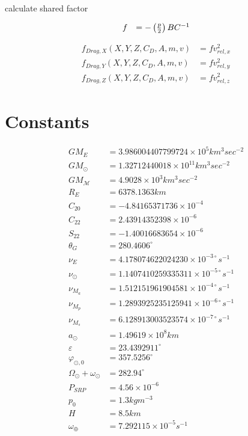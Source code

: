 \documentclass{article}
\begin{document}
calculate shared factor

\begin{equation}
\begin{array}{ll}
f &= -\left(p \over 2\right)BC^{-1}
\end{array}
\end{equation}

\begin{equation}
\begin{array}{ll}
f_{Drag,X}(X,Y,Z,C_D,A,m,v) &= fv_{rel,x}^2 \\
f_{Drag,Y}(X,Y,Z,C_D,A,m,v) &= fv_{rel,y}^2 \\
f_{Drag,Z}(X,Y,Z,C_D,A,m,v) &= fv_{rel,z}^2
\end{array}
\end{equation}


\section{Constants}

\begin{align}
GM_E &=3.986004407799724\times 10^5 km^3 sec^{-2} \\
GM_\odot &= 1.32712440018\times 10^{11}km^3 sec^{-2} \\
GM_{\mathcal M} &=4.9028\times 10^{3}km^3 sec^{-2} \\
R_E &=6378.1363 km\\
C_{20} &= -4.84165371736\times 10^{-4}\\
C_{22} &= 2.43914352398\times 10^{-6}\\
S_{22} &=-1.40016683654\times 10^{-6}\\
\theta_G &= 280.4606^\circ\\
\nu_E &= 4.178074622024230\times 10^{-3\circ} s^{-1}\\
\nu_\odot &= 1.1407410259335311\times 10^{-5\circ} s^{-1}\\
\nu_{M_a} &= 1.512151961904581\times 10^{-4\circ} s^{-1}\\
\nu_{M_p} &= 1.2893925235125941\times 10^{-6\circ} s^{-1}\\
\nu_{M_s} &= 6.128913003523574\times 10^{-7\circ} s^{-1}\\
a_\odot &= 1.49619 \times 10^8 km\\
\varepsilon &= 23.4392911^\circ\\
\varphi_{\odot,0} &= 357.5256^\circ\\
\Omega_\odot + \omega_\odot &= 282.94^\circ \\
P_{SRP} &= 4.56\times 10^{-6} \\
p_0 &= 1.3 kg m^{-3} \\
H &= 8.5 km \\
\omega_{\oplus} &= 7.292115 \times 10^{-5} s^{-1}
\end{align}
\end{document}
